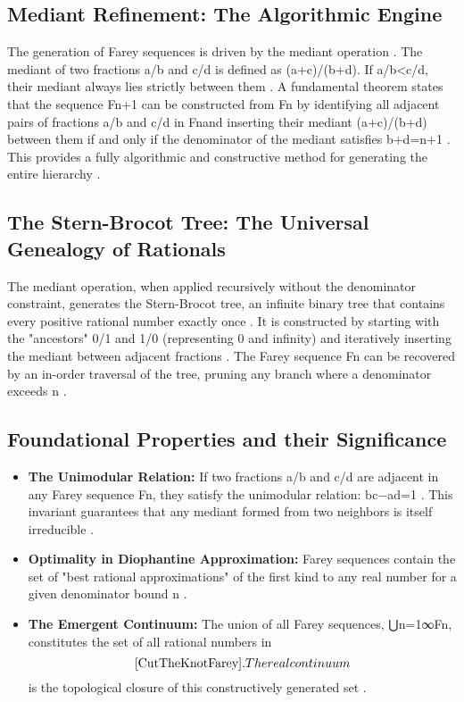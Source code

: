 \documentclass[12pt,a4paper]{article}
\theoremstyle{definition}
\theoremstyle{remark}
\begin{document}
\subsection{Mediant Refinement: The Algorithmic Engine}
The generation of Farey sequences is driven by the mediant operation \cite{RanickiFareyProject, NumberanalyticsFarey}. The mediant of two fractions a/b and c/d is defined as (a+c)/(b+d). If a/b<c/d, their mediant always lies strictly between them \cite{KnottFarey, RanickiFareyProject, NumberanalyticsFarey}.
A fundamental theorem states that the sequence Fn+1​ can be constructed from Fn​ by identifying all adjacent pairs of fractions a/b and c/d in Fn​ and inserting their mediant (a+c)/(b+d) between them if and only if the denominator of the mediant satisfies b+d=n+1 \cite{DUMMIT, Zukin2016, JNSFarey}. This provides a fully algorithmic and constructive method for generating the entire hierarchy \cite{Zukin2016, JNSFarey}.
\subsection{The Stern-Brocot Tree: The Universal Genealogy of Rationals}
The mediant operation, when applied recursively without the denominator constraint, generates the Stern-Brocot tree, an infinite binary tree that contains every positive rational number exactly once \cite{WikipediaSternBrocot, CPAlgorithmsSternBrocot}. It is constructed by starting with the "ancestors" 0/1 and 1/0 (representing 0 and infinity) and iteratively inserting the mediant between adjacent fractions \cite{WikipediaSternBrocot, CutTheKnotSternBrocot}. The Farey sequence Fn​ can be recovered by an in-order traversal of the tree, pruning any branch where a denominator exceeds n \cite{WikipediaSternBrocot, CPAlgorithmsSternBrocot}.
\subsection{Foundational Properties and their Significance}
\begin{itemize}
\item \textbf{The Unimodular Relation:} If two fractions a/b and c/d are adjacent in any Farey sequence Fn​, they satisfy the unimodular relation: bc−ad=1 \cite{DUMMIT, Zukin2016}. This invariant guarantees that any mediant formed from two neighbors is itself irreducible \cite{Zukin2016, JNSFarey}.
\item \textbf{Optimality in Diophantine Approximation:} Farey sequences contain the set of "best rational approximations" of the first kind to any real number for a given denominator bound n \cite{Zukin2016, JNSFarey}.
\item \textbf{The Emergent Continuum:} The union of all Farey sequences, ⋃n=1∞​Fn​, constitutes the set of all rational numbers in
$$\cite{CutTheKnotFarey}. The real continuum$$
is the topological closure of this constructively generated set \cite{Zukin2016}.
\end{itemize}
\end{document}
